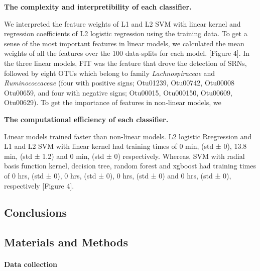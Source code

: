 \documentclass[11pt,]{article}
\let\oldparagraph\paragraph
\renewcommand{\paragraph}[1]{\oldparagraph{#1}\mbox{}}
\begin{document}
\textbf{The complexity and interpretibility of each classifier.}

We interpreted the feature weights of L1 and L2 SVM with linear kernel
and regression coefficients of L2 logistic regression using the training
data. To get a sense of the most important features in linear models, we
calculated the mean weights of all the features over the 100 data-splits
for each model. {[}Figure 4{]}. In the three linear models, FIT was the
feature that drove the detection of SRNs, followed by eight OTUs which
belong to family \emph{Lachnospiraceae} and \emph{Ruminococcaceae} (four
with positive signs; Otu01239, Otu00742, Otu00008 Otu00659, and four
with negative signs; Otu00015, Otu000150, Otu00609, Otu00629). To get
the importance of features in non-linear models, we

\textbf{The computational efficiency of each classifier.}

Linear models trained faster than non-linear models. L2 logistic
Rregression and L1 and L2 SVM with linear kernel had training times of 0
min, (std ± 0), 13.8 min, (std ± 1.2) and 0 min, (std ± 0) respectively.
Whereas, SVM with radial basis function kernel, decision tree, random
forest and xgboost had training times of 0 hrs, (std ± 0), 0 hrs, (std ±
0), 0 hrs, (std ± 0) and 0 hrs, (std ± 0), respectively {[}Figure 4{]}.

\subsection{Conclusions}\label{conclusions}

\subsection{Materials and Methods}\label{materials-and-methods}

\paragraph{Data collection}\label{data-collection}
\end{document}
